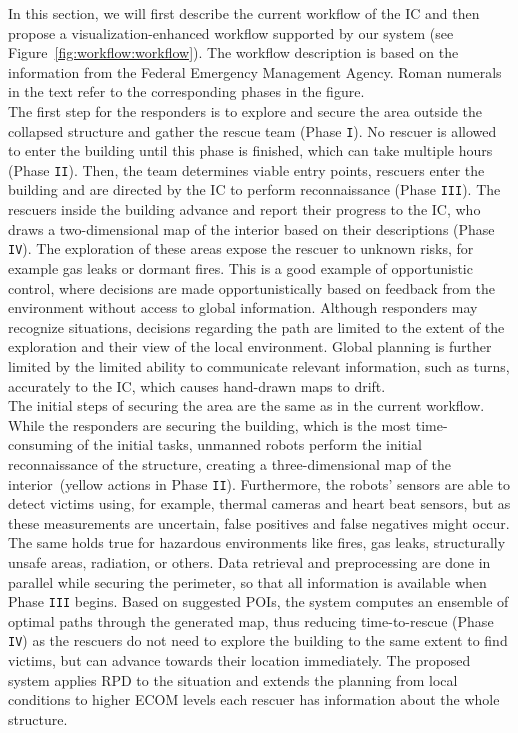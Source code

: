 \documentclass{egpubl}
\begin{document}
In this section, we will first describe the current workflow of the IC and then propose a visualization-enhanced workflow supported by our system (see Figure~\ref{fig:workflow:workflow}). The workflow description is based on the information from the Federal Emergency Management Agency. Roman numerals in the text refer to the corresponding phases in the figure.\\
%
 The first step for the responders is to explore and secure the area outside the collapsed structure and gather the rescue team (Phase \texttt{I}). No rescuer is allowed to enter the building until this phase is finished, which can take multiple hours (Phase \texttt{II}). Then, the team determines viable entry points, rescuers enter the building and are directed by the IC to perform reconnaissance (Phase \texttt{III}). The rescuers inside the building advance and report their progress to the IC, who draws a two-dimensional map of the interior based on their descriptions (Phase \texttt{IV}). The exploration of these areas expose the rescuer to unknown risks, for example gas leaks or dormant fires. This is a good example of opportunistic control, where decisions are made opportunistically based on feedback from the environment without access to global information. Although responders may recognize situations, decisions regarding the path are limited to the extent of the exploration and their view of the local environment. Global planning is further limited by the limited ability to communicate relevant information, such as turns, accurately to the IC, which causes hand-drawn maps to drift.\\
%
 The initial steps of securing the area are the same as in the current workflow. While the responders are securing the building, which is the most time-consuming of the initial tasks, unmanned robots perform the initial reconnaissance of the structure, creating a three-dimensional map of the interior~(yellow actions in Phase \texttt{II}). Furthermore, the robots' sensors are able to detect victims using, for example, thermal cameras and heart beat sensors, but as these measurements are uncertain, false positives and false negatives might occur. The same holds true for hazardous environments like fires, gas leaks, structurally unsafe areas, radiation, or others. Data retrieval and preprocessing are done in parallel while securing the perimeter, so that all information is available when Phase \texttt{III} begins. Based on suggested POIs, the system computes an ensemble of optimal paths through the generated map, thus reducing time-to-rescue (Phase \texttt{IV}) as the rescuers do not need to explore the building to the same extent to find victims, but can advance towards their location immediately. The proposed system applies RPD to the situation and extends the planning from local conditions to higher ECOM levels each rescuer has information about the whole structure.
\end{document}
